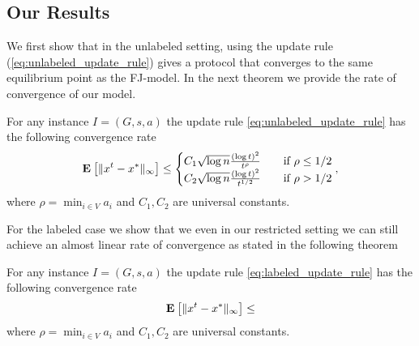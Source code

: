 \subsection{Our Results}
We first show that in the unlabeled setting, using the update rule
(\ref{eq:unlabeled_update_rule}) gives a protocol that converges to the
same equilibrium point as the FJ-model. In the next theorem we provide
the rate of convergence of our model.
\begin{theorem}
  For any instance $I = (G, s, a)$ the update rule \ref{eq:unlabeled_update_rule}
  has the following convergence rate
\[
\Exp{\norm{\infty}{x^t - x^*}} \leq
    \begin{cases}
      C_1 \sqrt{\log n}\frac{(\log t)^{2}}{t^\rho}
      &\quad\text{if } \rho \leq 1/2\\
      C_2 \sqrt{\log n}\frac{(\log t)^{2}}{t^{1/2}}
      &\quad\text{if } \rho > 1/2\\
    \end{cases},
  \]
  where $\rho = \min_{i \in V} a_i$ and $C_1, C_2$ are universal constants.
\end{theorem}

For the labeled case we show that we even in our restricted setting we can still
achieve an almost linear rate of convergence as stated in the following theorem

\begin{theorem}
  For any instance $I = (G, s, a)$ the update rule \ref{eq:labeled_update_rule}
  has the following convergence rate
\[
\Exp{\norm{\infty}{x^t - x^*}} \leq

  \]
  where $\rho = \min_{i \in V} a_i$ and $C_1, C_2$ are universal constants.
\end{theorem}




